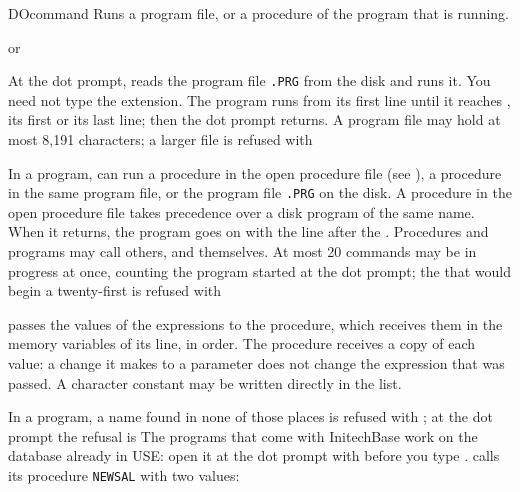 \begin{XbaseEntry}{DO}{command}
Runs a program file, or a procedure of the program that is running.
\Syntax
{}
\par or\par
{}
\Usage
At the dot prompt,   reads the program file
\texttt{.PRG} from the disk and runs it.  You need not type the
extension.  The program runs from its first line until it reaches
, its first  or its last line; then the dot prompt
returns.  A program file may hold at most 8,191 characters; a larger file is
refused with 

In a program,   can run a procedure in the open procedure
file (see ), a procedure in the same program file, or
the program file \texttt{.PRG} on the disk.  A procedure in the
open procedure file takes precedence over a disk program of the same name.
When it returns, the program goes on with the line
after the .  Procedures and programs may call others, and themselves.  At
most 20  commands may be in progress at once, counting the program
started at the dot prompt; the  that would begin a twenty-first is
refused with 

 passes the values of the expressions to the procedure, which
receives them in the memory variables of its  line, in order.
The procedure receives a copy of each value: a change it makes to a parameter
does not change the expression that was passed.
A character constant may be written directly in the  list.

In a program, a name found in none of those places is refused with
; at the dot prompt the refusal is
\Tips
The programs that come with InitechBase work on the database already in USE:
open it at the dot prompt with  before you type .
\Examples
{} calls its procedure \texttt{NEWSAL} with two values:
\end{XbaseEntry}

